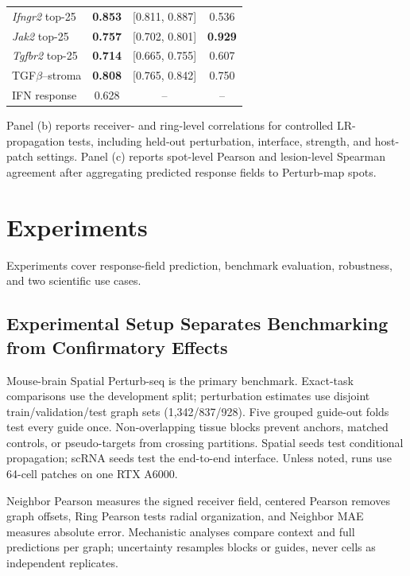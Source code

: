 \documentclass[sigconf,review,balance=false]{acmart}
\begin{document}
\begin{table}[t]
\begin{minipage}[t]{0.38\linewidth}
{\begin{tabular}{@{}lccc@{}}
\midrule
\textit{Ifngr2} top-25 & \textbf{0.853} & [0.811, 0.887] & 0.536 \\
\textit{Jak2} top-25   & \textbf{0.757} & [0.702, 0.801] & \textbf{0.929} \\
\textit{Tgfbr2} top-25 & \textbf{0.714} & [0.665, 0.755] & 0.607 \\
TGF$\beta$--stroma     & \textbf{0.808} & [0.765, 0.842] & 0.750 \\
IFN response            & 0.628 & -- & -- \\
\bottomrule
\end{tabular}
}
\vspace{3pt}
\parbox{\linewidth}{\scriptsize
Panel (b) reports receiver- and ring-level correlations for controlled LR-propagation tests, including held-out perturbation, interface, strength, and host-patch settings. Panel (c) reports spot-level Pearson and lesion-level Spearman agreement after aggregating predicted response fields to Perturb-map spots.}
\end{minipage}
\vspace{-2pt}
\end{table}




\section{Experiments}
\label{sec:experiments}
Experiments cover response-field prediction, benchmark evaluation, robustness,
and two scientific use cases.

\subsection{Experimental Setup Separates Benchmarking from Confirmatory Effects}
\label{sec:benchmark_metrics}
Mouse-brain Spatial Perturb-seq is the primary benchmark. Exact-task comparisons
use the development split; perturbation estimates use disjoint
train/validation/test graph sets (1,342/837/928). Five grouped guide-out folds
test every guide once. Non-overlapping tissue blocks prevent anchors, matched
controls, or pseudo-targets from crossing partitions. Spatial seeds test
conditional propagation; scRNA seeds test the end-to-end interface. Unless
noted, runs use 64-cell patches on one RTX A6000.

Neighbor Pearson measures the signed receiver field, centered Pearson removes
graph offsets, Ring Pearson tests radial organization, and Neighbor MAE measures
absolute error. Mechanistic analyses compare context and full predictions per
graph; uncertainty resamples blocks or guides, never cells as independent
replicates.
\end{document}
